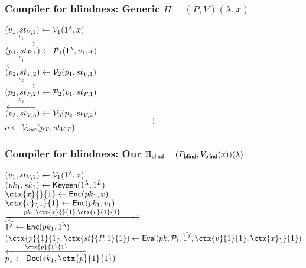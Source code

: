 \documentclass{beamer}
\begin{document}
\begin{frame}
	\frametitle{Compiler for blindness: Generic $\Pi=(P, V)(\lambda, x)$}
	\pause
	$(v_1, st_{V, 1})\leftarrow\mathcal{V}_1(1^\lambda, x)$
	\pause
	\\\hspace*{\fill}$\xrightarrow{\qquad v_1\qquad}$\hspace*{\fill}
	\pause
	\\\hspace*{\fill}$(p_1, st_{P, 1})\leftarrow\mathcal{P}_1(1^\lambda, v_1, x)$
	\pause
	\\\hspace*{\fill}$\xleftarrow{\qquad p_1\qquad}$\hspace*{\fill}
	\pause
	\\$(v_2, st_{V, 2})\leftarrow\mathcal{V}_2(p_1, st_{V, 1})$
	\pause
	\\\hspace*{\fill}$\xrightarrow{\qquad v_2\qquad}$\hspace*{\fill}
	\pause
	\\\hspace*{\fill}$(p_2, st_{P, 2})\leftarrow\mathcal{P}_2(v_1, st_{P, 1})$
	\pause
	\\\hspace*{\fill}$\xleftarrow{\qquad p_2\qquad}$\hspace*{\fill}
	\pause
	\\$(v_3, st_{V, 3})\leftarrow\mathcal{V}_3(p_2, st_{V, 2})$
	\pause
	$$\vdots$$
	\pause
	$o\leftarrow\mathcal{V}_{out}(p_T, st_{V,T})$
\end{frame}

\begin{frame}
	\frametitle{Compiler for blindness: Our $\Pi_{\mathsf{blind}}=(P_{\mathsf{blind}}, V_{\mathsf{blind}}(x))(\lambda)$}
	$(v_1, st_{V, 1})\leftarrow\mathcal{V}_1(1^\lambda, x)$
	\pause
	\\$(pk_1, sk_1)\leftarrow\mathsf{Keygen}(1^\lambda, 1^L)$
	\pause
	\\$\ctx{x}{}{1}\leftarrow\Enc(pk_1, x)$
	\pause
	\\$\ctx{v}{1}{1}\leftarrow\Enc(pk_1, v_1)$
	\pause
	\\\hspace*{\fill}$\xrightarrow{\qquad pk_1, \ctx{x}{}{1}, \ctx{v}{1}{1}\qquad}$\hspace*{\fill}
	\pause
	\\\hspace*{\fill}$\widehat{1^\lambda}\leftarrow\mathsf{Enc}(pk_1, 1^\lambda)$
	\pause
	\\\hspace*{\fill}$(\ctx{p}{1}{1}, \ctx{st}{P, 1}{1})\leftarrow\Eval(pk, \cP_1, \widehat{1^\lambda}, \ctx{v}{1}{1}, \ctx{x}{}{1})$
	\pause
	\\\hspace*{\fill}$\xleftarrow{\qquad \ctx{p}{1}{1}\qquad}$\hspace*{\fill}
	\pause
	\\$p_1\leftarrow\Dec(sk_1, \ctx{p}{1}{1})$
\end{frame}
\end{document}
